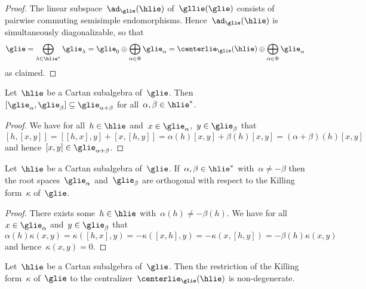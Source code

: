 \begin{proof}
  The linear subspace~$\ad_{\glie}(\hlie)$ of~$\gllie(\glie)$ consists of pairwise commuting semisimple endomorphisms.
  Hence~$\ad_{\glie}(\hlie)$ is simultaneously diagonalizable, so that
  \[
    \glie
    =
    \bigoplus_{\lambda \in \hlie^*} \glie_\lambda
    =
    \glie_0
    \oplus
    \bigoplus_{\alpha \in \Phi} \glie_\alpha
    =
    \centerlie_{\glie}(\hlie)
    \oplus
    \bigoplus_{\alpha \in \Phi} \glie_\alpha
  \]
  as claimed.
\end{proof}




\begin{lemma}
  Let~$\hlie$ be a Cartan subalgebra of~$\glie$.
  Then~$[\glie_\alpha, \glie_\beta] \subseteq \glie_{\alpha+\beta}$ for all~$\alpha, \beta \in \hlie^*$.
\end{lemma}


\begin{proof}
  We have for all~$h \in \hlie$ and~$x \in \glie_\alpha$,~$y \in \glie_\beta$ that
  \[
    [h,[x,y]]
    =
    [[h,x],y] + [x,[h,y]]
    =
    \alpha(h)[x,y] + \beta(h)[x,y]
    =
    (\alpha+\beta)(h) [x,y]
  \]
  and hence~$[x,y] \in \glie_{\alpha+\beta}$.
\end{proof}


\begin{lemma}
  \label{root spaces orthogonal with respect to killing form}
  Let~$\hlie$ be a Cartan subalgebra of~$\glie$.
  If~$\alpha, \beta \in \hlie^*$ with~$\alpha \neq -\beta$ then the root spaces~$\glie_\alpha$ and~$\glie_\beta$ are orthogonal with respect to the Killing form~$\kappa$ of~$\glie$.
\end{lemma}


\begin{proof}
 There exists some~$h \in \hlie$ with~$\alpha(h) \neq -\beta(h)$.
 We have for all~$x \in \glie_\alpha$ and~$y \in \glie_\beta$ that
 \[
  \alpha(h) \kappa(x,y)
  =
  \kappa([h,x],y)
  =
  -\kappa([x,h],y)
  =
  -\kappa(x,[h,y])
  =
  -\beta(h) \kappa(x,y)
 \]
 and hence~$\kappa(x,y) = 0$.
\end{proof}


\begin{corollary}
  \label{restriction of killing form to centralizer is non-degenerate}
  Let~$\hlie$ be a Cartan subalgebra of~$\glie$.
  Then the restriction of the Killing form~$\kappa$ of~$\glie$ to the centralizer~$\centerlie_{\glie}(\hlie)$ is non-degenerate.
\end{corollary}


